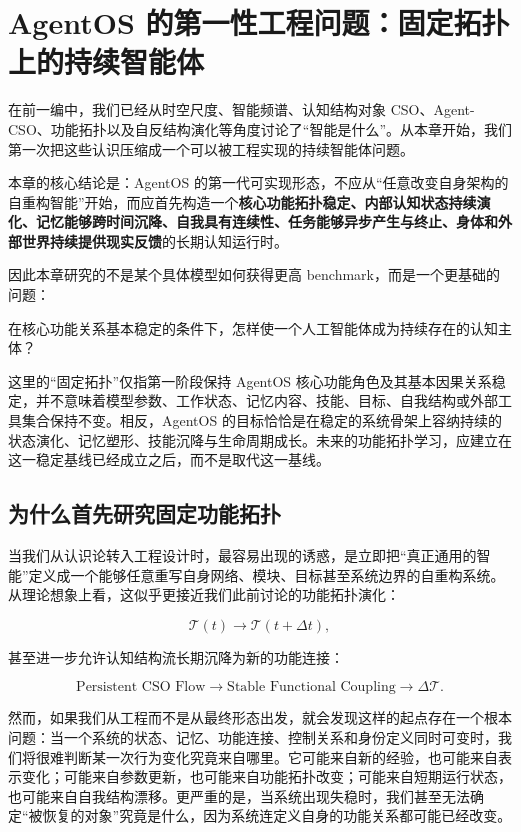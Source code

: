 \chapter{AgentOS 的第一性工程问题：固定拓扑上的持续智能体}
\label{chap:first_principle_agentos}

\begin{chapterlead}
在前一编中，我们已经从时空尺度、智能频谱、认知结构对象 CSO、Agent-CSO、功能拓扑以及自反结构演化等角度讨论了“智能是什么”。从本章开始，我们第一次把这些认识压缩成一个可以被工程实现的持续智能体问题。

本章的核心结论是：AgentOS 的第一代可实现形态，不应从“任意改变自身架构的自重构智能”开始，而应首先构造一个\textbf{核心功能拓扑稳定、内部认知状态持续演化、记忆能够跨时间沉降、自我具有连续性、任务能够异步产生与终止、身体和外部世界持续提供现实反馈}的长期认知运行时。

因此本章研究的不是某个具体模型如何获得更高 benchmark，而是一个更基础的问题：

\begin{statementbox}
在核心功能关系基本稳定的条件下，怎样使一个人工智能体成为持续存在的认知主体？
\end{statementbox}

这里的“固定拓扑”仅指第一阶段保持 AgentOS 核心功能角色及其基本因果关系稳定，并不意味着模型参数、工作状态、记忆内容、技能、目标、自我结构或外部工具集合保持不变。相反，AgentOS 的目标恰恰是在稳定的系统骨架上容纳持续的状态演化、记忆塑形、技能沉降与生命周期成长。未来的功能拓扑学习，应建立在这一稳定基线已经成立之后，而不是取代这一基线。
\end{chapterlead}


\section{为什么首先研究固定功能拓扑}

当我们从认识论转入工程设计时，最容易出现的诱惑，是立即把“真正通用的智能”定义成一个能够任意重写自身网络、模块、目标甚至系统边界的自重构系统。从理论想象上看，这似乎更接近我们此前讨论的功能拓扑演化：

\[
\mathcal{T}(t)
\rightarrow
\mathcal{T}(t+\Delta t),
\]

甚至进一步允许认知结构流长期沉降为新的功能连接：

\[
\text{Persistent CSO Flow}
\rightarrow
\text{Stable Functional Coupling}
\rightarrow
\Delta\mathcal{T}.
\]

然而，如果我们从工程而不是从最终形态出发，就会发现这样的起点存在一个根本问题：当一个系统的状态、记忆、功能连接、控制关系和身份定义同时可变时，我们将很难判断某一次行为变化究竟来自哪里。它可能来自新的经验，也可能来自表示变化；可能来自参数更新，也可能来自功能拓扑改变；可能来自短期运行状态，也可能来自自我结构漂移。更严重的是，当系统出现失稳时，我们甚至无法确定“被恢复的对象”究竟是什么，因为系统连定义自身的功能关系都可能已经改变。

